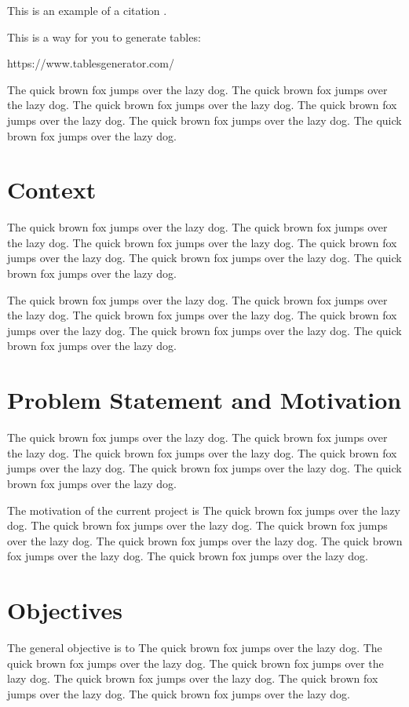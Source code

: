 \documentclass[11pt,a4paper]{report}
\begin{document}
This is an example of a citation \cite{Pedro2019}.   

This is a way for you to generate tables:

https://www.tablesgenerator.com/

The quick brown fox jumps over the lazy dog. The quick brown fox jumps over the lazy dog. The quick brown fox jumps over the lazy dog. The quick brown fox jumps over the lazy dog. The quick brown fox jumps over the lazy dog. The quick brown fox jumps over the lazy dog. 

\section{Context} 
\label{sec:context}
The quick brown fox jumps over the lazy dog. The quick brown fox jumps over the lazy dog. The quick brown fox jumps over the lazy dog. The quick brown fox jumps over the lazy dog. The quick brown fox jumps over the lazy dog. The quick brown fox jumps over the lazy dog. 

The quick brown fox jumps over the lazy dog. The quick brown fox jumps over the lazy dog. The quick brown fox jumps over the lazy dog. The quick brown fox jumps over the lazy dog. The quick brown fox jumps over the lazy dog. The quick brown fox jumps over the lazy dog. 

\section{Problem Statement and Motivation}
\label{sec:motivation}
The quick brown fox jumps over the lazy dog. The quick brown fox jumps over the lazy dog. The quick brown fox jumps over the lazy dog. The quick brown fox jumps over the lazy dog. The quick brown fox jumps over the lazy dog. The quick brown fox jumps over the lazy dog. 

The motivation of the current project is
The quick brown fox jumps over the lazy dog. The quick brown fox jumps over the lazy dog. The quick brown fox jumps over the lazy dog. The quick brown fox jumps over the lazy dog. The quick brown fox jumps over the lazy dog. The quick brown fox jumps over the lazy dog. 

\section{Objectives}
\label{sec:name}
The general objective is to
The quick brown fox jumps over the lazy dog. The quick brown fox jumps over the lazy dog. The quick brown fox jumps over the lazy dog. The quick brown fox jumps over the lazy dog. The quick brown fox jumps over the lazy dog. The quick brown fox jumps over the lazy dog. 
\end{document}

